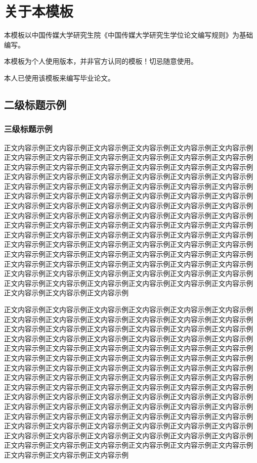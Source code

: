 \chapter{关于本模板}

本模板以中国传媒大学研究生院《中国传媒大学研究生学位论文编写规则》为基础编写。

本模板为个人使用版本，并非官方认同的模板！切忌随意使用。

本人已使用该模板来编写毕业论文。

\section{二级标题示例}

\subsection{三级标题示例}

正文内容示例正文内容示例正文内容示例正文内容示例正文内容示例正文内容示例正文内容示例正文内容示例正文内容示例正文内容示例正文内容示例正文内容示例正文内容示例正文内容示例正文内容示例正文内容示例正文内容示例正文内容示例正文内容示例正文内容示例正文内容示例正文内容示例正文内容示例正文内容示例正文内容示例正文内容示例正文内容示例正文内容示例正文内容示例正文内容示例正文内容示例正文内容示例正文内容示例正文内容示例正文内容示例正文内容示例正文内容示例正文内容示例正文内容示例正文内容示例正文内容示例正文内容示例正文内容示例正文内容示例正文内容示例正文内容示例正文内容示例正文内容示例正文内容示例正文内容示例正文内容示例正文内容示例正文内容示例正文内容示例正文内容示例正文内容示例正文内容示例正文内容示例正文内容示例正文内容示例正文内容示例正文内容示例正文内容示例正文内容示例正文内容示例正文内容示例正文内容示例正文内容示例正文内容示例正文内容示例正文内容示例正文内容示例正文内容示例正文内容示例正文内容示例正文内容示例正文内容示例正文内容示例正文内容示例正文内容示例正文内容示例正文内容示例正文内容示例正文内容示例正文内容示例正文内容示例正文内容示例正文内容示例正文内容示例正文内容示例正文内容示例正文内容示例正文内容示例

正文内容示例正文内容示例正文内容示例正文内容示例正文内容示例正文内容示例正文内容示例正文内容示例正文内容示例正文内容示例正文内容示例正文内容示例正文内容示例正文内容示例正文内容示例正文内容示例正文内容示例正文内容示例正文内容示例正文内容示例正文内容示例正文内容示例正文内容示例正文内容示例正文内容示例正文内容示例正文内容示例正文内容示例正文内容示例正文内容示例正文内容示例正文内容示例正文内容示例正文内容示例正文内容示例正文内容示例正文内容示例正文内容示例正文内容示例正文内容示例正文内容示例正文内容示例正文内容示例正文内容示例正文内容示例正文内容示例正文内容示例正文内容示例正文内容示例正文内容示例正文内容示例正文内容示例正文内容示例正文内容示例正文内容示例正文内容示例正文内容示例正文内容示例正文内容示例正文内容示例正文内容示例正文内容示例正文内容示例正文内容示例正文内容示例正文内容示例正文内容示例正文内容示例正文内容示例正文内容示例正文内容示例正文内容示例正文内容示例正文内容示例正文内容示例正文内容示例正文内容示例正文内容示例正文内容示例正文内容示例正文内容示例正文内容示例正文内容示例正文内容示例正文内容示例正文内容示例正文内容示例正文内容示例正文内容示例正文内容示例正文内容示例正文内容示例正文内容示例

